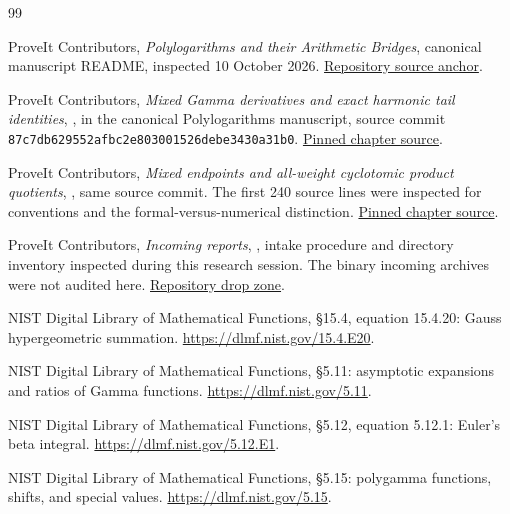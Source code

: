 \documentclass[11pt,letterpaper]{article}
\numberwithin{equation}{section}
\theoremstyle{definition}\newtheorem{definition}[theorem]{Definition}
\theoremstyle{remark}\newtheorem{remark}[theorem]{Remark}
\begin{document}
\begin{thebibliography}{99}

ProveIt Contributors,
\emph{Polylogarithms and their Arithmetic Bridges}, canonical manuscript
README, inspected 10 October 2026.
\href{https://github.com/VladimirReshetnikov/ProveIt/blob/87c7db629552afbc2e803001526debe3430a31b0/Analysis/Polylogarithms/docs/manuscript/README.md}{Repository source anchor}.

ProveIt Contributors,
\emph{Mixed Gamma derivatives and exact harmonic tail identities},
, in the canonical
Polylogarithms manuscript, source commit
\texttt{87c7db629552afbc2e803001526debe3430a31b0}.
\href{https://github.com/VladimirReshetnikov/ProveIt/blob/87c7db629552afbc2e803001526debe3430a31b0/Analysis/Polylogarithms/docs/manuscript/chapters/07-mixed-dougall-identities.tex}{Pinned chapter source}.

ProveIt Contributors,
\emph{Mixed endpoints and all-weight cyclotomic product quotients},
, same source commit.
The first 240 source lines were inspected for conventions and the
formal-versus-numerical distinction.
\href{https://github.com/VladimirReshetnikov/ProveIt/blob/87c7db629552afbc2e803001526debe3430a31b0/Analysis/Polylogarithms/docs/manuscript/chapters/04-cyclotomic-quotients.tex}{Pinned chapter source}.

ProveIt Contributors,
\emph{Incoming reports}, , intake procedure
and directory inventory inspected during this research session.
The binary incoming archives were not audited here.
\href{https://github.com/VladimirReshetnikov/ProveIt/tree/main/docs/incoming}{Repository drop zone}.

NIST Digital Library of Mathematical Functions,
\S15.4, equation 15.4.20: Gauss hypergeometric summation.
\url{https://dlmf.nist.gov/15.4.E20}.

NIST Digital Library of Mathematical Functions,
\S5.11: asymptotic expansions and ratios of Gamma functions.
\url{https://dlmf.nist.gov/5.11}.

NIST Digital Library of Mathematical Functions,
\S5.12, equation 5.12.1: Euler's beta integral.
\url{https://dlmf.nist.gov/5.12.E1}.

NIST Digital Library of Mathematical Functions,
\S5.15: polygamma functions, shifts, and special values.
\url{https://dlmf.nist.gov/5.15}.


\end{thebibliography}
\end{document}
